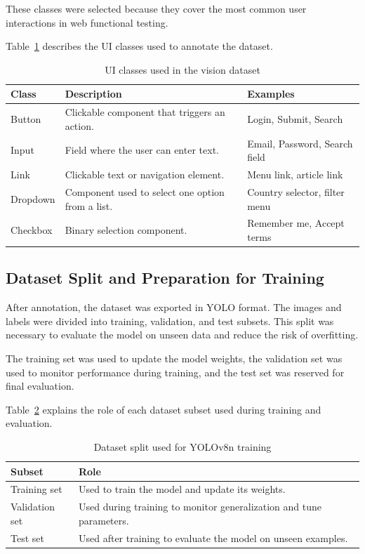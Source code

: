 These classes were selected because they cover the most common user interactions in web functional testing.

Table~\ref{tab:ui_classes} describes the UI classes used to annotate the dataset.

\begin{table}[H]
	\centering
	\caption{UI classes used in the vision dataset}
	\label{tab:ui_classes}
	\renewcommand{\arraystretch}{1.35}
	\small
	\begin{tabularx}{\textwidth}{|l|X|X|}
		\hline
		\rowcolor{gray!20}
		\textbf{Class} & \textbf{Description} & \textbf{Examples} \\ \hline
		Button & Clickable component that triggers an action. & Login, Submit, Search \\ \hline
		Input & Field where the user can enter text. & Email, Password, Search field \\ \hline
		Link & Clickable text or navigation element. & Menu link, article link \\ \hline
		Dropdown & Component used to select one option from a list. & Country selector, filter menu \\ \hline
		Checkbox & Binary selection component. & Remember me, Accept terms \\ \hline
	\end{tabularx}
\end{table}

\subsection{Dataset Split and Preparation for Training}
\label{subsec:dataset_split}

After annotation, the dataset was exported in YOLO format. The images and labels were divided into training, validation, and test subsets. This split was necessary to evaluate the model on unseen data and reduce the risk of overfitting.

The training set was used to update the model weights, the validation set was used to monitor performance during training, and the test set was reserved for final evaluation.

Table~\ref{tab:dataset_split} explains the role of each dataset subset used during training and evaluation.

\begin{table}[H]
	\centering
	\caption{Dataset split used for YOLOv8n training}
	\label{tab:dataset_split}
	\renewcommand{\arraystretch}{1.35}
	\small
	\begin{tabularx}{\textwidth}{|l|X|}
		\hline
		\rowcolor{gray!20}
		\textbf{Subset} & \textbf{Role} \\ \hline
		Training set & Used to train the model and update its weights. \\ \hline
		Validation set & Used during training to monitor generalization and tune parameters. \\ \hline
		Test set & Used after training to evaluate the model on unseen examples. \\ \hline
	\end{tabularx}
\end{table}

